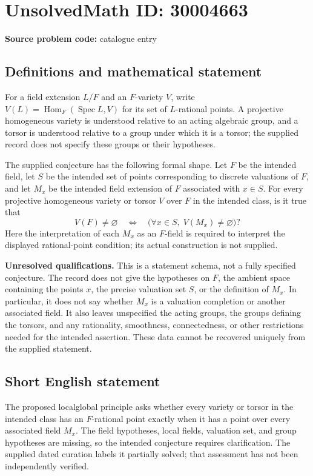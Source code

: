 \documentclass[11pt]{article}
\begin{document}
\section*{UnsolvedMath ID: 30004663}
\textbf{Source problem code:} catalogue entry
\subsection{Definitions and mathematical statement}
For a field extension \(L/F\) and an \(F\)-variety \(V\), write \(V(L)=\operatorname{Hom}_F(\operatorname{Spec}L,V)\) for its set of \(L\)-rational points. A projective homogeneous variety is understood relative to an acting algebraic group, and a torsor is understood relative to a group under which it is a torsor; the supplied record does not specify these groups or their hypotheses.

The supplied conjecture has the following formal shape. Let \(F\) be the intended field, let \(S\) be the intended set of points corresponding to discrete valuations of \(F\), and let \(M_x\) be the intended field extension of \(F\) associated with \(x\in S\). For every projective homogeneous variety or torsor \(V\) over \(F\) in the intended class, is it true that
\[
V(F)\ne\varnothing
\quad\Longleftrightarrow\quad
\bigl(\forall x\in S,\;V(M_x)\ne\varnothing\bigr)?
\]
Here the interpretation of each \(M_x\) as an \(F\)-field is required to interpret the displayed rational-point condition; its actual construction is not supplied.

\textbf{Unresolved qualifications.} This is a statement schema, not a fully specified conjecture. The record does not give the hypotheses on \(F\), the ambient space containing the points \(x\), the precise valuation set \(S\), or the definition of \(M_x\). In particular, it does not say whether \(M_x\) is a valuation completion or another associated field. It also leaves unspecified the acting groups, the groups defining the torsors, and any rationality, smoothness, connectedness, or other restrictions needed for the intended assertion. These data cannot be recovered uniquely from the supplied statement.
\subsection{Short English statement}
The proposed local\textendash global principle asks whether every variety or torsor in the intended class has an \(F\)-rational point exactly when it has a point over every associated field \(M_x\). The field hypotheses, local fields, valuation set, and group hypotheses are missing, so the intended conjecture requires clarification. The supplied dated curation labels it partially solved; that assessment has not been independently verified.
\end{document}
